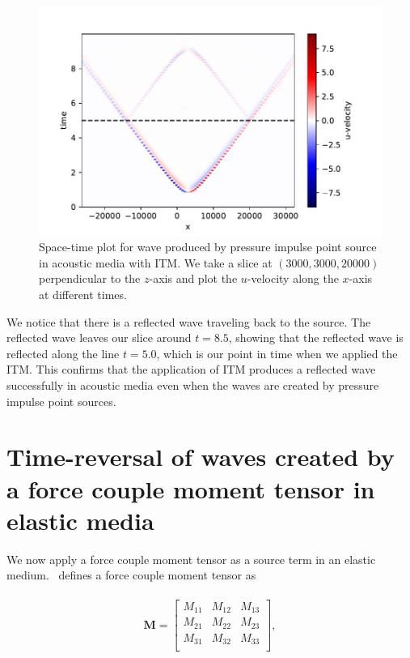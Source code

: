 \begin{figure}[htpb]
    \centering
    \includegraphics[width=0.75\linewidth]{figures/pressure-impulse-ITM.pdf}
    \caption{Space-time plot for wave produced by pressure impulse point source in acoustic media with \ac{ITM}. We take a slice at $\left(3000,3000,20000\right)$perpendicular to the $z$-axis and plot the
    $u$-velocity along the $x$-axis at different times.}
    \label{fig:space-timeplot-pressureITM}
\end{figure}

We notice that there is a reflected wave traveling back to the source. The reflected wave leaves our slice around $t=8.5$, showing that the reflected wave is reflected
along the line $t=5.0$, which is our point in time when we applied the \ac{ITM}. This confirms that the application of \ac{ITM} produces a reflected wave successfully in acoustic media even
when the waves are created by pressure impulse point sources.

\section{Time-reversal of waves created by a force couple moment tensor in elastic media}\label{sec:doublecouple}
We now apply a force couple moment tensor as a source term in an elastic medium.~\parencite[Sec. 9.2]{shearer_2019} defines a force couple moment tensor as

\begin{align}
    \begin{split}
        \mathbf{M} =
            \begin{bmatrix}
                M_{11} & M_{12} & M_{13} \\
                M_{21} & M_{22} & M_{23} \\
                M_{31} & M_{32} & M_{33} \\
            \end{bmatrix} ,
    \end{split}
\end{align}

